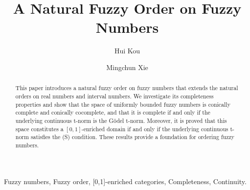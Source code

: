 \documentclass[preprint,3p,times]{elsarticle}
\theoremstyle{plain}
\theoremstyle{definition}
\numberwithin{equation}{section}
\begin{document}
\begin{frontmatter}



\title{A Natural Fuzzy Order on  Fuzzy Numbers}


\author{Hui Kou}

\author{Mingchun Xie}

\address{School of Mathematics, Sichuan University, Chengdu 610064, China}

\begin{abstract}
This paper introduces a natural fuzzy order on fuzzy numbers that extends the natural orders on real numbers and interval numbers. We investigate its completeness properties and show that the space of uniformly bounded fuzzy numbers is conically complete and conically cocomplete, and that it is complete if and only if the underlying continuous t-norm is the Gödel t-norm. Moreover, it is proved that this space constitutes a \([0,1]\)-enriched domain if and only if the underlying continuous t-norm satisfies the (S) condition. These results provide a foundation for ordering fuzzy numbers.
\end{abstract}

\begin{keyword}
Fuzzy numbers, Fuzzy order, [0,1]-enriched categories, Completeness, Continuity.  

\end{keyword}

\end{frontmatter}
\end{document}

